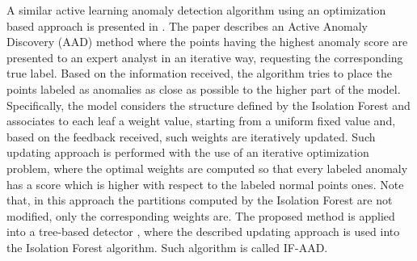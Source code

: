 A similar active learning anomaly detection algorithm using an optimization based approach is presented in \cite{das2016incorporating}. The paper describes an Active Anomaly Discovery (AAD) method where the points having the highest anomaly score are presented to an expert analyst in an iterative way, requesting the corresponding true label. Based on the information received, the algorithm tries to place the points labeled as anomalies as close as possible to the higher part of the model. Specifically, the model considers the structure defined by the Isolation Forest and associates to each leaf a weight value, starting from a uniform fixed value and, based on the feedback received, such weights are iteratively updated. Such updating approach is performed with the use of an iterative optimization problem, where the optimal weights are computed so that every labeled anomaly has a score which is higher with respect to the labeled normal points ones. Note that, in this approach the partitions computed by the Isolation Forest are not modified, only the corresponding weights are. The proposed method is applied into a tree-based detector \cite{das2017incorporating}, where the described updating approach is used into the Isolation Forest algorithm. Such algorithm is called IF-AAD. 

